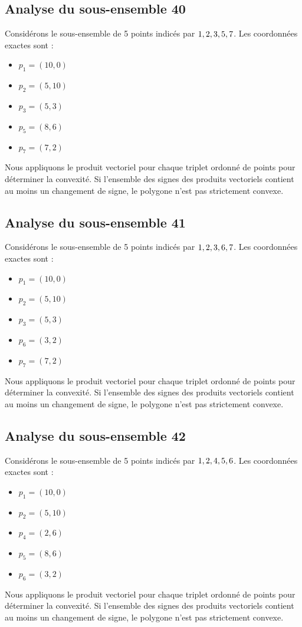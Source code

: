 \documentclass[11pt]{article}
\begin{document}
\subsection{Analyse du sous-ensemble 40}
Considérons le sous-ensemble de 5 points indicés par $\\{ 1, 2, 3, 5, 7 \\}$.
Les coordonnées exactes sont :
\begin{itemize}
\item $p_1 = (10, 0)$
\item $p_2 = (5, 10)$
\item $p_3 = (5, 3)$
\item $p_5 = (8, 6)$
\item $p_7 = (7, 2)$
\end{itemize}
Nous appliquons le produit vectoriel pour chaque triplet ordonné de points pour déterminer la convexité. Si l'ensemble des signes des produits vectoriels contient au moins un changement de signe, le polygone n'est pas strictement convexe.
\newpage

\subsection{Analyse du sous-ensemble 41}
Considérons le sous-ensemble de 5 points indicés par $\\{ 1, 2, 3, 6, 7 \\}$.
Les coordonnées exactes sont :
\begin{itemize}
\item $p_1 = (10, 0)$
\item $p_2 = (5, 10)$
\item $p_3 = (5, 3)$
\item $p_6 = (3, 2)$
\item $p_7 = (7, 2)$
\end{itemize}
Nous appliquons le produit vectoriel pour chaque triplet ordonné de points pour déterminer la convexité. Si l'ensemble des signes des produits vectoriels contient au moins un changement de signe, le polygone n'est pas strictement convexe.
\newpage

\subsection{Analyse du sous-ensemble 42}
Considérons le sous-ensemble de 5 points indicés par $\\{ 1, 2, 4, 5, 6 \\}$.
Les coordonnées exactes sont :
\begin{itemize}
\item $p_1 = (10, 0)$
\item $p_2 = (5, 10)$
\item $p_4 = (2, 6)$
\item $p_5 = (8, 6)$
\item $p_6 = (3, 2)$
\end{itemize}
Nous appliquons le produit vectoriel pour chaque triplet ordonné de points pour déterminer la convexité. Si l'ensemble des signes des produits vectoriels contient au moins un changement de signe, le polygone n'est pas strictement convexe.
\newpage
\end{document}
